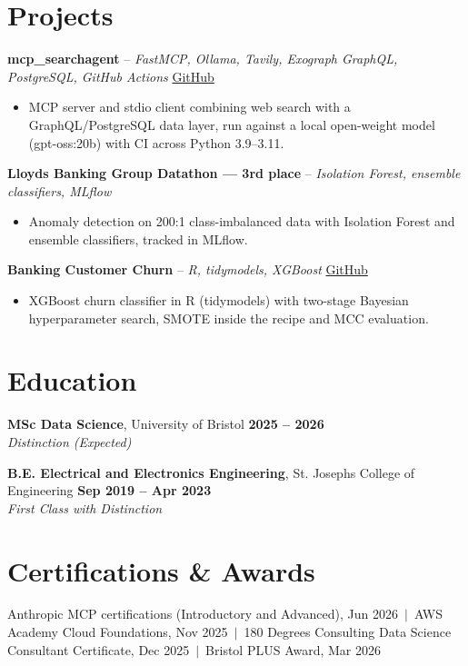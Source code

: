 \documentclass[a4paper,11pt]{article}
\begin{document}
\section{Projects}
\noindent\textbf{mcp\_searchagent} -- \textit{FastMCP, Ollama, Tavily, Exograph GraphQL, PostgreSQL, GitHub Actions} \hfill \href{https://github.com/Thiruvel-AP/mcp_searchagent}{GitHub}
\begin{itemize}
  \item MCP server and stdio client combining web search with a GraphQL/PostgreSQL data layer, run against a local open-weight model (gpt-oss:20b) with CI across Python 3.9–3.11.
\end{itemize}
\vspace{3pt}
\noindent\textbf{Lloyd\textquotesingle{}s Banking Group Datathon — 3rd place} -- \textit{Isolation Forest, ensemble classifiers, MLflow} \hfill 
\begin{itemize}
  \item Anomaly detection on 200:1 class-imbalanced data with Isolation Forest and ensemble classifiers, tracked in MLflow.
\end{itemize}
\vspace{3pt}
\noindent\textbf{Banking Customer Churn} -- \textit{R, tidymodels, XGBoost} \hfill \href{https://github.com/Thiruvel-AP/Banking-Customer-Churn-Prediction}{GitHub}
\begin{itemize}
  \item XGBoost churn classifier in R (tidymodels) with two-stage Bayesian hyperparameter search, SMOTE inside the recipe and MCC evaluation.
\end{itemize}

\section{Education}
\textbf{MSc Data Science}, University of Bristol \hfill \textbf{2025 – 2026}\\ \textit{Distinction (Expected)}\par
\vspace{3pt}
\textbf{B.E. Electrical and Electronics Engineering}, St. Joseph\textquotesingle{}s College of Engineering \hfill \textbf{Sep 2019 – Apr 2023}\\ \textit{First Class with Distinction}\par

\section{Certifications \& Awards}
Anthropic MCP certifications (Introductory and Advanced), Jun 2026 \,$|$\, AWS Academy Cloud Foundations, Nov 2025 \,$|$\, 180 Degrees Consulting Data Science Consultant Certificate, Dec 2025 \,$|$\, Bristol PLUS Award, Mar 2026
\end{document}
